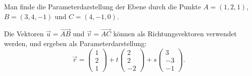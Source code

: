 \begin{beispiel}
Man finde die Parameterdarstellung der Ebene durch die Punkte
$A=(1,2,1)$,
$B=(3,4,-1)$ und
$C=(4,-1,0)$.

\smallskip

{\parindent 0pt Die} Vektoren $\vec u=\overrightarrow{AB}$ und
$\vec v=\overrightarrow{AC}$ können als Richtungsvektoren
verwendet werden, und ergeben als Parameterdarstellung:
\begin{equation}
\vec r=\begin{pmatrix}1\\2\\1 \end{pmatrix}
+
t\begin{pmatrix}2\\2\\-2\end{pmatrix}
+
s\begin{pmatrix}3\\-3\\-1\end{pmatrix}.
\label{beispielebene}
\end{equation}
\end{beispiel}

